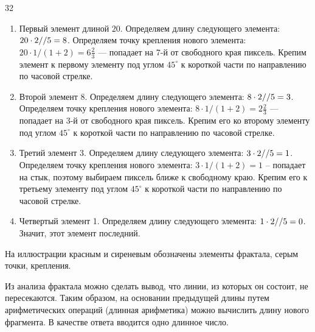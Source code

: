 \begin{myverbbox}[\small]{\voutput}
    32
\end{myverbbox}

\explanationSection
\begin{enumerate}
    \item Первый элемент длиной $20$. Определяем длину следующего элемента: $20 \cdot 2\space // \space 5 = 8$. Определяем точку 
    крепления нового элемента: $20 \cdot 1 / (1 + 2) = 6 \frac{2}{3}$  — попадает на 7-й от свободного края пиксель. Крепим элемент 
    к первому элементу под углом $45^{\circ}$ к короткой части по направлению по часовой стрелке. 
    \item Второй элемент $8$. Определяем длину следующего элемента: $8 \cdot 2 \space // \space 5 = 3$. Определяем точку крепления 
    нового элемента: $8 \cdot 1 / (1 + 2) = 2 \frac{2}{3}$  — попадает на 3-й от свободного края пиксель. Крепим его ко второму 
    элементу под углом $45^{\circ}$ к короткой части по направлению по часовой стрелке. 
    \item Третий элемент 3. Определяем длину следующего элемента: $3 \cdot 2 \space // \space 5 = 1$. Определяем точку крепления 
    нового элемента: $3 \cdot 1 / (1 + 2) = 1$  -- попадает на стык, поэтому выбираем пиксель ближе к свободному краю. 
    Крепим его к третьему элементу под углом $45^{\circ}$ к короткой части по направлению по часовой стрелке.
    \item Четвертый элемент 1. Определяем длину следующего элемента: $1 \cdot 2 \space // \space 5 = 0$. Значит, этот элемент последний.
\end{enumerate}

На иллюстрации красным и сиреневым обозначены элементы фрактала, серым точки, крепления.


\solutionSection
Из анализа фрактала можно сделать вывод, что линии, из которых он состоит, не пересекаются. Таким образом, на основании предыдущей длины путем арифметических операций (длинная арифметика) можно вычислить длину нового фрагмента. В качестве ответа вводится одно длинное число.

